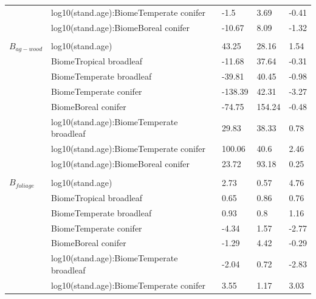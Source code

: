 \documentclass[
]{article}
\begin{document}
\begin{longtable}{lllll}
\hspace{1em} & log10(stand.age):BiomeTemperate conifer & -1.5 & 3.69 & -0.41\\
\hspace{1em} & log10(stand.age):BiomeBoreal conifer & -10.67 & 8.09 & -1.32\\
\addlinespace[1em]
\multicolumn{4}{l}{\textbf{}}\\
\hspace{1em}$B_{ag-wood}$ & log10(stand.age) & 43.25 & 28.16 & 1.54\\
\hspace{1em} & BiomeTropical broadleaf & -11.68 & 37.64 & -0.31\\
\hspace{1em} & BiomeTemperate broadleaf & -39.81 & 40.45 & -0.98\\
\hspace{1em} & BiomeTemperate conifer & -138.39 & 42.31 & -3.27\\
\hspace{1em} & BiomeBoreal conifer & -74.75 & 154.24 & -0.48\\
\hspace{1em} & log10(stand.age):BiomeTemperate broadleaf & 29.83 & 38.33 & 0.78\\
\hspace{1em} & log10(stand.age):BiomeTemperate conifer & 100.06 & 40.6 & 2.46\\
\hspace{1em} & log10(stand.age):BiomeBoreal conifer & 23.72 & 93.18 & 0.25\\
\addlinespace[1em]
\multicolumn{4}{l}{\textbf{}}\\
\hspace{1em}$B_{foliage}$ & log10(stand.age) & 2.73 & 0.57 & 4.76\\
\hspace{1em} & BiomeTropical broadleaf & 0.65 & 0.86 & 0.76\\
\hspace{1em} & BiomeTemperate broadleaf & 0.93 & 0.8 & 1.16\\
\hspace{1em} & BiomeTemperate conifer & -4.34 & 1.57 & -2.77\\
\hspace{1em} & BiomeBoreal conifer & -1.29 & 4.42 & -0.29\\
\hspace{1em} & log10(stand.age):BiomeTemperate broadleaf & -2.04 & 0.72 & -2.83\\
\hspace{1em} & log10(stand.age):BiomeTemperate conifer & 3.55 & 1.17 & 3.03\\

\end{longtable}
\end{document}
